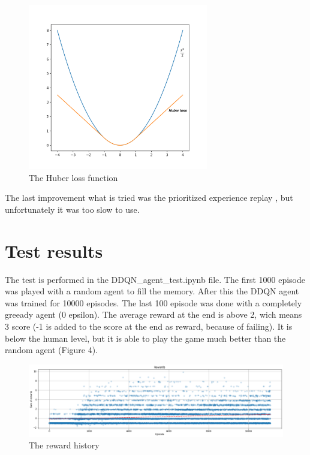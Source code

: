 \documentclass[12p]{article}
\begin{document}
    \begin{figure}[h]
    \includegraphics[width=0.7\textwidth]{huber_loss}
    \centering
    \caption{The Huber loss function}
    \centering
    \end{figure}

    \par
    The last improvement what is tried was the prioritized experience replay \cite{PER}, but unfortunately it was too slow to use.

    \section{Test results}
      The test is performed in the DDQN\_agent\_test.ipynb file. The first 1000 episode was played with a random agent to fill the memory.
      After this the DDQN agent was trained for 10000 episodes. The last 100 episode was done with a completely greeady agent (0 epsilon).
      The average reward at the end is above 2, wich means 3 score (-1 is added to the score at the end as reward, because
      of failing). It is below the human level, but it is able to play the game much better than the random agent (Figure 4).

    \begin{figure}[H]
    \includegraphics[width=1.1\textwidth]{reward_history}
    \centering
    \caption{The reward history}
    \centering
    \end{figure}
\end{document}
